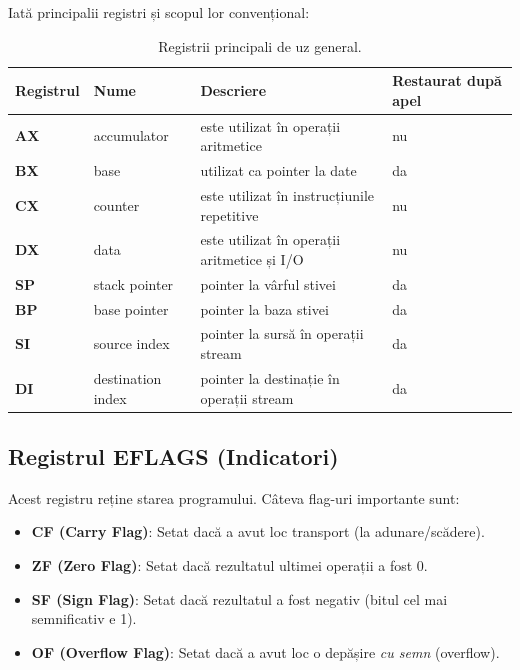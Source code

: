 \documentclass[12pt]{article}
\begin{document}
Iată principalii registri și scopul lor convențional:

\begin{table}[h!]
\centering
\begin{tabular}{llll}
\toprule
\textbf{Registrul} & \textbf{Nume} & \textbf{Descriere} & \textbf{Restaurat după apel} \\
\midrule
\textbf{AX} & accumulator & este utilizat în operații aritmetice & nu \\
\textbf{BX} & base & utilizat ca pointer la date & da \\
\textbf{CX} & counter & este utilizat în instrucțiunile repetitive & nu \\
\textbf{DX} & data & este utilizat în operații aritmetice și I/O & nu \\
\textbf{SP} & stack pointer & pointer la vârful stivei & da \\
\textbf{BP} & base pointer & pointer la baza stivei & da \\
\textbf{SI} & source index & pointer la sursă în operații stream & da \\
\textbf{DI} & destination index & pointer la destinație în operații stream & da \\
\bottomrule
\end{tabular}
\caption{Registrii principali de uz general.}
\label{tab:registri}
\end{table}

\subsection{Registrul EFLAGS (Indicatori)}
Acest registru reține starea programului. Câteva flag-uri importante sunt:
\begin{itemize}
    \item \textbf{CF (Carry Flag)}: Setat dacă a avut loc transport (la adunare/scădere).
    \item \textbf{ZF (Zero Flag)}: Setat dacă rezultatul ultimei operații a fost 0.
    \item \textbf{SF (Sign Flag)}: Setat dacă rezultatul a fost negativ (bitul cel mai semnificativ e 1).
    \item \textbf{OF (Overflow Flag)}: Setat dacă a avut loc o depășire \textit{cu semn} (overflow).
\end{itemize}
\end{document}
